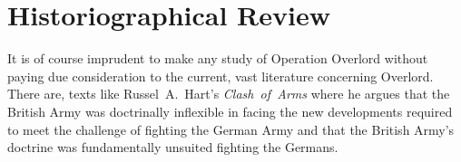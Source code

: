 \documentclass[noraggedright]{turabian-researchpaper}
\begin{document}


\section{Historiographical Review}










It is of course imprudent to make any study of Operation Overlord without paying
due consideration to the current, vast literature concerning Overlord.  
There are, texts like \mbox{Russel A. Hart's} \mbox{\textit{Clash of Arms}}
 where he argues that the 
British Army was doctrinally inflexible in facing the new developments required
to meet the challenge of fighting the German Army and that the British Army's
doctrine was fundamentally unsuited fighting the Germans.\autocite[8]{clash}
\end{document}
